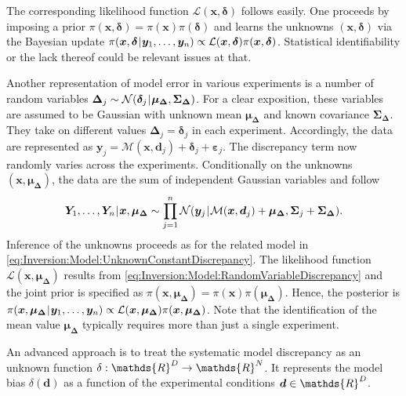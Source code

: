 The corresponding likelihood function \(\mathcal{L}(\bm{x},\bm{\delta})\) follows easily.
One proceeds by imposing a prior \(\pi(\bm{x},\bm{\delta}) = \pi(\bm{x}) \pi(\bm{\delta})\) and learns the unknowns \((\bm{x},\bm{\delta})\)
via the Bayesian update \(\pi(\bm{x},\bm{\delta} {\:\!}|{\:\!} \bm{y}_1,\ldots,\bm{y}_n) \propto \mathcal{L}(\bm{x},\bm{\delta}) \pi(\bm{x},\bm{\delta})\).
Statistical identifiability or the lack thereof could be relevant issues at that.
\par %
Another representation of model error in various experiments is a number of random variables
\(\bm{\Delta}_j \sim \mathcal{N}(\bm{\delta}_j {\:\!}|{\:\!} \bm{\mu}_{\bm{\Delta}},\bm{\Sigma}_{\bm{\Delta}})\).
For a clear exposition, these variables are assumed to be Gaussian with unknown mean \(\bm{\mu}_{\bm{\Delta}}\) and known covariance \(\bm{\Sigma}_{\bm{\Delta}}\).
They take on different values \(\bm{\Delta}_j = \bm{\delta}_j\) in each experiment.
Accordingly, the data are represented as \(\bm{y}_j = \mathcal{M}(\bm{x},\bm{d}_j) + \bm{\delta}_j + \bm{\varepsilon}_j\).
The discrepancy term now randomly varies across the experiments.
Conditionally on the unknowns \((\bm{x},\bm{\mu}_{\bm{\Delta}})\), the data are the sum of independent Gaussian variables and follow
\begin{equation} \label{eq:Inversion:Model:RandomVariableDiscrepancy}
  \bm{Y}_1,\ldots,\bm{Y}_n {\:\!}|{\:\!} \bm{x},\bm{\mu}_{\bm{\Delta}}
  \sim \prod\limits_{j=1}^n \mathcal{N}(\bm{y}_j {\:\!}|{\:\!} \mathcal{M}(\bm{x},\bm{d}_j)+ \bm{\mu}_{\bm{\Delta}}, \bm{\Sigma}_j + \bm{\Sigma}_{\bm{\Delta}}).
\end{equation}
Inference of the unknowns proceeds as for the related model in \cref{eq:Inversion:Model:UnknownConstantDiscrepancy}.
The likelihood function \(\mathcal{L}(\bm{x},\bm{\mu}_{\bm{\Delta}})\) results from \cref{eq:Inversion:Model:RandomVariableDiscrepancy}
and the joint prior is specified as \(\pi(\bm{x},\bm{\mu}_{\bm{\Delta}}) = \pi(\bm{x}) \pi(\bm{\mu}_{\bm{\Delta}})\).
Hence, the posterior is  \(\pi(\bm{x},\bm{\mu}_{\bm{\Delta}} {\:\!}|{\:\!} \bm{y}_1,\ldots,\bm{y}_n) \propto \mathcal{L}(\bm{x},\bm{\mu}_{\bm{\Delta}}) \pi(\bm{x},\bm{\mu}_{\bm{\Delta}})\).
Note that the identification of the mean value \(\bm{\mu}_{\bm{\Delta}}\) typically requires more than just a single experiment.
\par %
An advanced approach is to treat the systematic model discrepancy as an unknown function \(\delta: \mathds{R}^\dimControl \rightarrow \mathds{R}^\dimData\).
It represents the model bias \(\delta(\bm{d})\) as a function of the experimental conditions \(\bm{d} \in \mathds{R}^\dimControl\).
